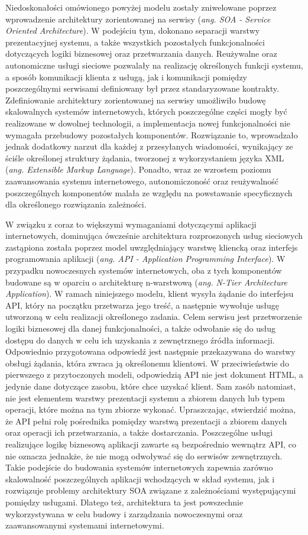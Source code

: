 Niedoskonałości omówionego powyżej modelu zostały zniwelowane poprzez wprowadzenie architektury zorientowanej na serwisy (\textit{ang. SOA - Service Oriented Architecture}). W podejściu tym, dokonano separacji warstwy prezentacyjnej systemu, a także wszystkich pozostałych funkcjonalności dotyczących logiki biznesowej oraz przetwarzania danych. Reużywalne oraz autonomiczne usługi sieciowe pozwalały na realizację określonych funkcji systemu, a sposób komunikacji klienta z usługą, jak i komunikacji pomiędzy poszczególnymi serwisami definiowany był przez standaryzowane kontrakty. Zdefiniowanie architektury zorientowanej na serwisy umożliwiło budowę skalowalnych systemów internetowych, których poszczególne części mogły być realizowane w dowolnej technologii, a implementacja nowej funkcjonalności nie wymagała przebudowy pozostałych komponentów. Rozwiązanie to, wprowadzało jednak dodatkowy narzut dla każdej z przesyłanych wiadomości, wynikający ze ściśle określonej struktury żądania, tworzonej z wykorzystaniem języka XML (\textit{ang. Extensible Markup Language}). Ponadto, wraz ze wzrostem poziomu zaawansowania systemu internetowego, autonomiczoność oraz reużywalność poszczególnych komponentów malała ze względu na powstawanie specyficznych dla określonego rozwiązania zależności.

W związku z coraz to większymi wymaganiami dotyczącymi aplikacji internetowych, dominująca ówcześnie architektura rozproszonych usług sieciowych zastąpiona została poprzez model uwzględniający warstwę kliencką oraz interfejs programowania aplikacji (\textit{ang. API - Application Programming Interface}). W przypadku nowoczesnych systemów internetowych, oba z tych komponentów budowane są w oparciu o architekturę n-warstwową (\textit{ang. N-Tier Architecture Application}). W ramach niniejszego modelu, klient wysyła żądanie do interfejsu API, który na początku przetwarza jego treść, a następnie wywołuje usługę utworzoną w celu realizacji określonego zadania. Celem serwisu jest przetworzenie logiki biznesowej dla danej funkcjonalności, a także odwołanie się do usług dostępu do danych w celu ich uzyskania z zewnętrznego źródła informacji. Odpowiednio przygotowana odpowiedź jest następnie przekazywana do warstwy obsługi żądania, która zwraca ją określonemu klientowi. W przeciwieństwie do pierwszego z przytoczonych modeli, odpowiedzią API nie jest dokument HTML, a jedynie dane dotyczące zasobu, które chce uzyskać klient. Sam zasób natomiast, nie jest elementem warstwy prezentacji systemu a zbiorem danych lub typem operacji, które można na tym zbiorze wykonać. Upraszczając, stwierdzić można, że API pełni rolę pośrednika pomiędzy warstwą prezentacji a zbiorem danych oraz operacji ich przetwarzania, a także dostarczania. Poszczególne usługi realizujące logikę biznesową aplikacji zawarte są bezpośrednio wewnątrz API, co nie oznacza jednakże, że nie mogą odwoływać się do serwisów zewnętrznych. Takie podejście do budowania systemów internetowych zapewnia zarówno skalowalność poszczególnych aplikacji wchodzących w skład systemu, jak i rozwiązuje problemy architektury SOA związane z zależnościami występującymi pomiędzy usługami. Dlatego też, architektura ta jest powszechnie wykorzystywana w celu budowy i zarządzania nowoczesnymi oraz zaawansowanymi systemami internetowymi.

